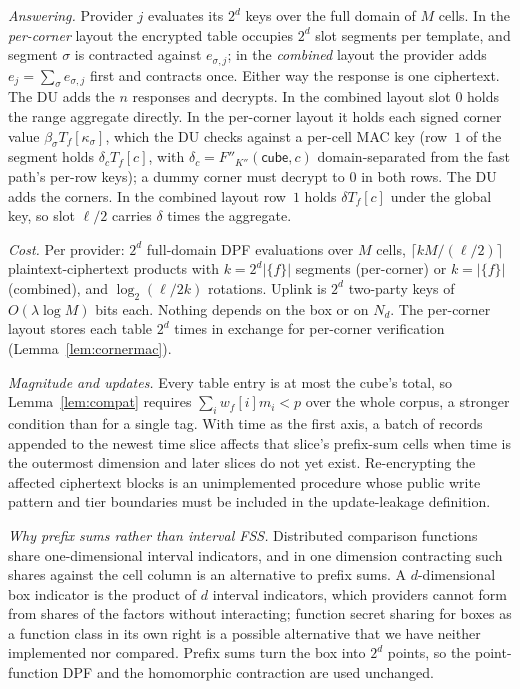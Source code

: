 \documentclass[a4paper,fleqn]{cas-sc}
\newif\ifauthorchecks
\newcommand{\authorcheck}[1]{\ifauthorchecks{\color{red}\textsf{[Authors: #1]}}\fi}
\begin{document}
\emph{Answering.} Provider $j$ evaluates its $2^d$ keys over the full domain of
$M$ cells. In the \emph{per-corner} layout the encrypted table occupies $2^d$
slot segments per template, and segment $\sigma$ is contracted against
$e_{\sigma,j}$; in the \emph{combined} layout the provider adds
$e_j=\sum_\sigma e_{\sigma,j}$ first and contracts once. Either way the response
is one ciphertext. The DU adds the $n$ responses and decrypts. In the combined
layout slot $0$ holds the range aggregate directly. In the per-corner layout it
holds each signed corner value $\beta_\sigma T_f[\kappa_\sigma]$, which the DU
checks against a per-cell MAC key (row~$1$ of the segment holds
$\delta_c T_f[c]$, with $\delta_c=F''_{K''}(\mathsf{cube},c)$ domain-separated
from the fast path's per-row keys); a dummy corner must decrypt to $0$ in both
rows. The DU adds the corners. In the combined layout row~$1$ holds
$\delta T_f[c]$ under the global key, so slot $\ell/2$ carries $\delta$ times
the aggregate.

\emph{Cost.} Per provider: $2^d$ full-domain DPF evaluations over $M$ cells,
$\lceil kM/(\ell/2)\rceil$ plaintext-ciphertext products with $k=2^d|\{f\}|$
segments (per-corner) or $k=|\{f\}|$ (combined), and $\log_2(\ell/2k)$
rotations. Uplink is $2^d$ two-party keys of $O(\lambda\log M)$ bits each.
Nothing depends on the box or on $N_d$. The per-corner layout stores each
table $2^d$ times in exchange for per-corner verification
(Lemma~\ref{lem:cornermac}).

\emph{Magnitude and updates.} Every table entry is at most the cube's total,
so Lemma~\ref{lem:compat} requires $\sum_i w_f[i]m_i<p$ over the whole corpus,
a stronger condition than for a single tag. With time as the first axis, a
batch of records appended to the newest time slice affects that slice's
prefix-sum cells when time is the outermost dimension and later slices
do not yet exist. Re-encrypting the affected ciphertext blocks is an
unimplemented procedure whose public write pattern and tier
boundaries must be included in the update-leakage definition.

\emph{Why prefix sums rather than interval FSS.} Distributed comparison
functions \citep{boyle2016function} share one-dimensional interval indicators,
and in one dimension contracting such shares against the cell column is an
alternative to prefix sums. A $d$-dimensional box indicator is the product of
$d$ interval indicators, which providers cannot form from shares of the
factors without interacting; function secret sharing for boxes as a function
class in its own right is a possible alternative that we have neither
implemented nor compared. Prefix sums turn the box into $2^d$ points, so the
point-function DPF and the homomorphic contraction are used unchanged.
\authorcheck{Check the FSS literature for multi-dimensional interval
functions (key size, evaluation cost) and compare.}
\end{document}
